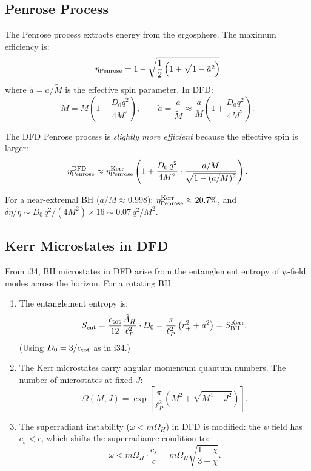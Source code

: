 \documentclass[11pt,a4paper]{article}
\begin{document}
\subsection{Penrose Process}

The Penrose process extracts energy from the ergosphere. The maximum efficiency is:
\begin{equation}
\eta_{\rm Penrose} = 1 - \sqrt{\frac{1}{2}\left(1 + \sqrt{1 - \tilde a^2}\right)}
\end{equation}
where $\tilde a = a/\tilde M$ is the effective spin parameter. In DFD:
\begin{equation}
\tilde M = M\left(1 - \frac{D_0 q^2}{4M^2}\right), \qquad \tilde a = \frac{a}{\tilde M} \approx \frac{a}{M}\left(1 + \frac{D_0 q^2}{4M^2}\right).
\end{equation}

The DFD Penrose process is \emph{slightly more efficient} because the effective spin is larger:
\begin{equation}
\eta_{\rm Penrose}^{\rm DFD} \approx \eta_{\rm Penrose}^{\rm Kerr}\left(1 + \frac{D_0\,q^2}{4M^2}\cdot\frac{a/M}{\sqrt{1-(a/M)^2}}\right).
\end{equation}

For a near-extremal BH ($a/M \approx 0.998$): $\eta_{\rm Penrose}^{\rm Kerr} \approx 20.7\%$, and $\delta\eta/\eta \sim D_0\,q^2/(4M^2) \times 16 \sim 0.07\,q^2/M^2$.

\subsection{Kerr Microstates in DFD}

From i34, BH microstates in DFD arise from the entanglement entropy of $\psi$-field modes across the horizon. For a rotating BH:

\begin{enumerate}
\item The entanglement entropy is:
\begin{equation}
S_{\rm ent} = \frac{c_{\rm tot}}{12}\frac{\tilde A_H}{\ell_P^2}\cdot D_0 = \frac{\pi}{\ell_P^2}\left(r_+^2 + a^2\right) = S_{\rm BH}^{\rm Kerr}.
\end{equation}
(Using $D_0 = 3/c_{\rm tot}$ as in i34.)

\item The Kerr microstates carry angular momentum quantum numbers. The number of microstates at fixed $J$:
\begin{equation}
\Omega(M,J) = \exp\left[\frac{\pi}{\ell_P^2}\left(M^2 + \sqrt{M^4 - J^2}\right)\right].
\end{equation}

\item The superradiant instability ($\omega < m\Omega_H$) in DFD is modified: the $\psi$ field has $c_s < c$, which shifts the superradiance condition to:
\begin{equation}
\omega < m\Omega_H \cdot \frac{c_s}{c} = m\Omega_H\sqrt{\frac{1+\chi}{3+\chi}}.
\end{equation}
\end{enumerate}
\end{document}
